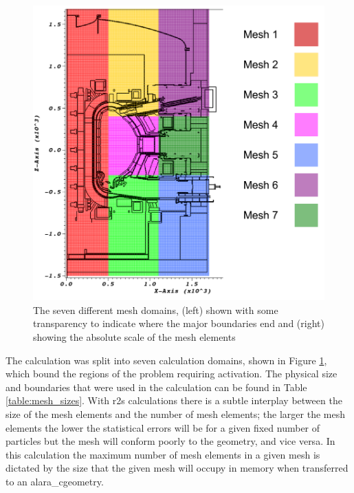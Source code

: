 \documentclass[12pt]{article}
\begin{document}
\begin{figure}[ht!]
  \centering
  \includegraphics[scale=0.4]{../plots/transport/job_splits.png}
  \caption{The seven different mesh domains, (left) shown with some transparency
           to indicate where the major boundaries end and (right) showing the
           absolute scale of the mesh elements}
  \label{fig:mesh_domains}
\end{figure}

The calculation was split into seven calculation domains, shown in Figure
\ref{fig:mesh_domains}, which bound the regions of the problem requiring
activation. The physical size and boundaries that were used in the calculation
can be found in Table \ref{table:mesh_sizes}. With \gls{r2s} calculations there is a
subtle interplay between the size of the mesh elements and the number of mesh
elements; the larger the mesh elements the lower the statistical errors will be
for a given fixed number of particles but the mesh will conform poorly to the
geometry, and vice versa. In this calculation the maximum number of mesh
elements in a given mesh is dictated by the size that the given mesh will
occupy in memory when transferred to an \gls{alara_c}geometry. 
\end{document}
